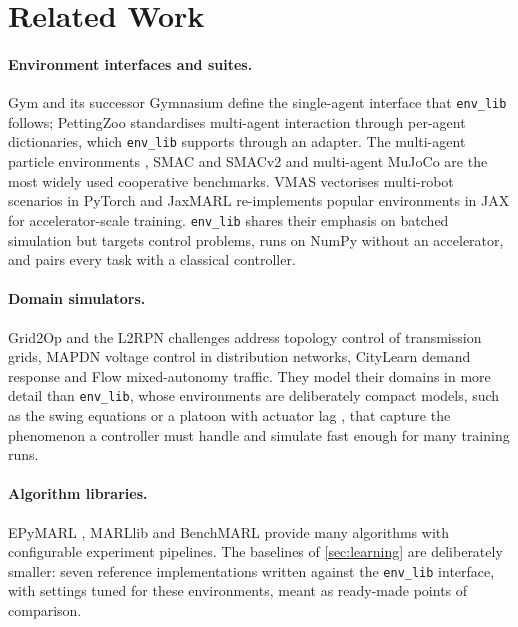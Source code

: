 \documentclass{article}
\begin{document}
\section{Related Work}

\paragraph{Environment interfaces and suites.} Gym and its successor
Gymnasium \citep{brockman2016gym,towers2024gymnasium} define the single-agent
interface that \texttt{env\_lib} follows; PettingZoo \citep{terry2021pettingzoo}
standardises multi-agent interaction through per-agent dictionaries, which
\texttt{env\_lib} supports through an adapter. The multi-agent particle
environments \citep{lowe2017maddpg}, SMAC and SMACv2
\citep{samvelyan2019smac,ellis2023smacv2} and multi-agent MuJoCo
\citep{peng2021facmac} are the most widely used cooperative benchmarks.
VMAS \citep{bettini2022vmas} vectorises multi-robot scenarios in PyTorch and
JaxMARL \citep{rutherford2024jaxmarl} re-implements popular environments in
JAX for accelerator-scale training. \texttt{env\_lib} shares their emphasis on
batched simulation but targets control problems, runs on NumPy without an
accelerator, and pairs every task with a classical controller.

\paragraph{Domain simulators.} Grid2Op and the L2RPN challenges
\citep{marot2020l2rpn} address topology control of transmission grids, MAPDN
\citep{wang2021mapdn} voltage control in distribution networks, CityLearn
\citep{vazquez2019citylearn} demand response and Flow \citep{wu2022flow}
mixed-autonomy traffic. They model their domains in more detail than
\texttt{env\_lib}, whose environments are deliberately compact models, such as
the swing equations \citep{kundur1994power} or a platoon with actuator lag
\citep{ploeg2011cacc}, that capture the phenomenon a controller must handle and
simulate fast enough for many training runs.

\paragraph{Algorithm libraries.} EPyMARL \citep{papoudakis2021benchmarking},
MARLlib \citep{hu2023marllib} and BenchMARL \citep{bettini2024benchmarl}
provide many algorithms with configurable experiment pipelines. The baselines
of \cref{sec:learning} are deliberately smaller: seven reference
implementations written against the \texttt{env\_lib} interface, with settings
tuned for these environments, meant as ready-made points of comparison.
\end{document}
